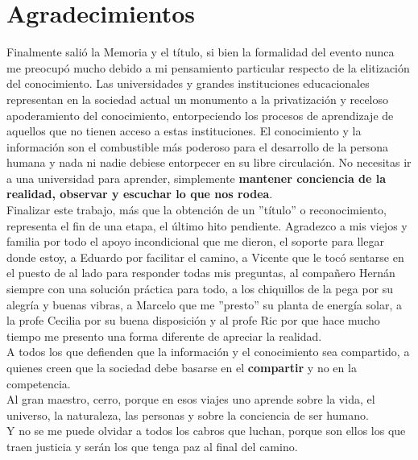 \chapter*{Agradecimientos}
\label{agradecimiento}

\normalsize Finalmente salió la Memoria y el título, si bien la formalidad del evento nunca me preocupó mucho debido a mi pensamiento particular respecto de la elitización del conocimiento. Las universidades y grandes instituciones educacionales representan en la sociedad actual un monumento a la privatización y receloso apoderamiento del conocimiento, entorpeciendo los procesos de aprendizaje de aquellos que no tienen acceso a estas instituciones. El conocimiento y la información son el combustible más poderoso para el desarrollo de la persona humana y nada ni nadie debiese entorpecer en su libre circulación. No necesitas ir a una universidad para aprender, simplemente \textbf{mantener conciencia de la realidad, observar y escuchar lo que nos rodea}.\\

\normalsize Finalizar este trabajo, más que la obtención de un ''título'' o reconocimiento, representa el fin de una etapa, el último hito pendiente. Agradezco a mis viejos y familia por todo el apoyo incondicional que me dieron, el soporte para llegar donde estoy, a Eduardo por facilitar el camino, a Vicente que le tocó sentarse en el puesto de al lado para responder todas mis preguntas, al compañero Hernán siempre con una solución práctica para todo, a los chiquillos de la pega por su alegría y buenas vibras, a Marcelo que me ''presto'' su planta de energía solar, a la profe Cecilia por su buena disposición y al profe Ric por que hace mucho tiempo me presento una forma diferente de apreciar la realidad.\\

\normalsize A todos los que defienden que la información y el conocimiento sea compartido, a quienes creen que la sociedad debe basarse en el \textbf{compartir} y no en la competencia.\\

\normalsize Al gran maestro, cerro, porque en esos viajes uno aprende sobre la vida, el universo, la naturaleza, las personas y sobre la conciencia de ser humano.\\

\normalsize Y no se me puede olvidar a todos los cabros que luchan, porque son ellos los que traen justicia y serán los que tenga paz al final del camino.
